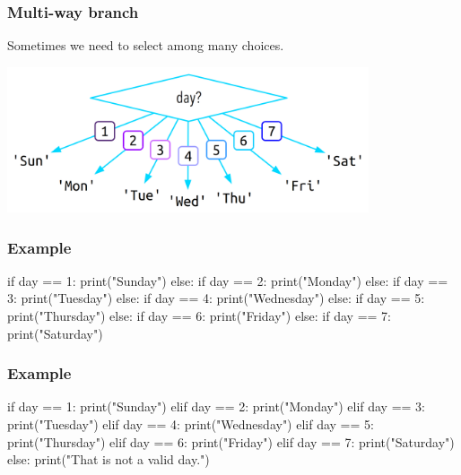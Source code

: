 \documentclass[11pt]{beamer}
\begin{document}
\begin{frame}[fragile]
  \frametitle{Multi-way branch}
  \Enlarge

  \begin{itemize}
  \myitem  Sometimes we need to select among many choices.
  \end{itemize}
  \includegraphics[width=0.8\textwidth]{./img/control-flow-multi.png}
\end{frame}

\begin{frame}[fragile]
  \frametitle{Example}
  \Enlarge

  \begin{semiverbatim}
if day == 1:
    print("Sunday")
else:
    if day == 2:
        print("Monday")
    else:
        if day == 3:
            print("Tuesday")
        else:
            if day == 4:
                print("Wednesday")
            else:
                if day == 5:
                    print("Thursday")
                else:
                    if day == 6:
                        print("Friday")
                    else:
                        if day == 7:
                            print("Saturday")
  \end{semiverbatim}
\end{frame}

\begin{frame}[fragile]
  \frametitle{Example}
  \Enlarge

  \begin{semiverbatim}
if day == 1:
    print("Sunday")
elif day == 2:
    print("Monday")
elif day == 3:
    print("Tuesday")
elif day == 4:
    print("Wednesday")
elif day == 5:
    print("Thursday")
elif day == 6:
    print("Friday")
elif day == 7:
    print("Saturday")
else:
    print("That is not a valid day.")
  \end{semiverbatim}
\end{frame}
\end{document}
